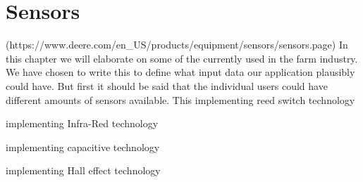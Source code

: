 \section{Sensors} (https://www.deere.com/en_US/products/equipment/sensors/sensors.page)
In this chapter we will elaborate on some of the currently used in the farm industry. We have chosen to write this to define what input data our application plausibly could have. But first it should be said that the individual users could have different amounts of sensors available.
This 
implementing reed switch technology

implementing Infra-Red technology

implementing capacitive technology

implementing Hall effect technology



